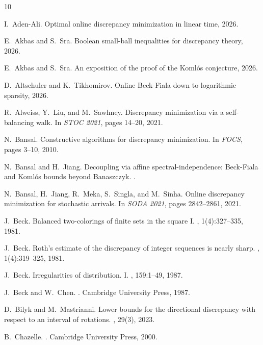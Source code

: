 \begin{thebibliography}{10}

I.~Aden-Ali.
\newblock Optimal online discrepancy minimization in linear time, 2026.

E.~Akbas and S.~Sra.
\newblock Boolean small-ball inequalities for discrepancy theory, 2026.

E.~Akbas and S.~Sra.
\newblock An exposition of the proof of the {K}oml\'os conjecture, 2026.

D.~Altschuler and K.~Tikhomirov.
\newblock Online {B}eck-{F}iala down to logarithmic sparsity, 2026.

R.~Alweiss, Y.~Liu, and M.~Sawhney.
\newblock Discrepancy minimization via a self-balancing walk.
\newblock In {\em STOC 2021}, pages 14--20, 2021.

N.~Bansal.
\newblock Constructive algorithms for discrepancy minimization.
\newblock In {\em FOCS}, pages 3--10, 2010.

N.~Bansal and H.~Jiang.
\newblock Decoupling via affine spectral-independence: {B}eck-{F}iala and {K}oml\'os bounds beyond {B}anaszczyk.
.

N.~Bansal, H.~Jiang, R.~Meka, S.~Singla, and M.~Sinha.
\newblock Online discrepancy minimization for stochastic arrivals.
\newblock In {\em SODA 2021}, pages 2842--2861, 2021.

J.~Beck.
\newblock Balanced two-colorings of finite sets in the square {I}.
, 1(4):327--335, 1981.

J.~Beck.
\newblock Roth's estimate of the discrepancy of integer sequences is nearly sharp.
, 1(4):319--325, 1981.

J.~Beck.
\newblock Irregularities of distribution. {I}.
, 159:1--49, 1987.

J.~Beck and W.~Chen.
.
\newblock Cambridge University Press, 1987.

D.~Bilyk and M.~Mastrianni.
\newblock Lower bounds for the directional discrepancy with respect to an interval of rotations.
, 29(3), 2023.

B.~Chazelle.
.
\newblock Cambridge University Press, 2000.


\end{thebibliography}
